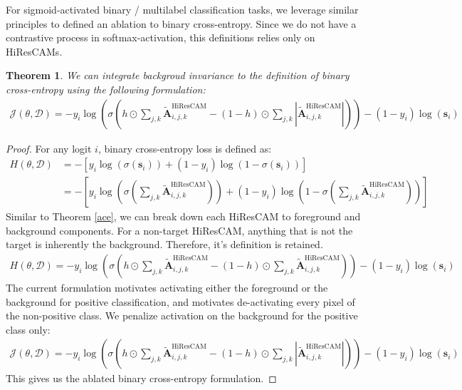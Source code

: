 \documentclass{article}
\theoremstyle{plain}
\newtheorem{theorem}{Theorem}[section]
\theoremstyle{definition}
\theoremstyle{remark}
\begin{document}
For sigmoid-activated binary / multilabel classification tasks, we leverage similar principles to defined an ablation to binary cross-entropy. Since we do not have a contrastive process in softmax-activation, this definitions relies only on HiResCAMs.

\begin{theorem}\label{abce}
	We can integrate backgroud invariance to the definition of binary cross-entropy using the following formulation:
	\begin{gather}
		\mathcal{J}(\theta, \mathcal{D}) = - y_i \log \left(\sigma\left(h \odot \sum_{j,k}\tilde{\mathcal{\bm{A}}}_{i,j,k}^{\text{HiResCAM}} - (1-h) \odot \sum_{j,k}|\tilde{\mathcal{\bm{A}}}_{i,j,k}^{\text{HiResCAM}}|\right) \right) - (1 - y_i) \log \left( \bm{s}_i \right)
	\end{gather}
\end{theorem}
\begin{proof} For any logit $i$, binary cross-entropy loss is defined as:
	\begin{align}
		H(\theta, \mathcal{D}) &= -\left[ y_i \log (\sigma(\bm{s}_i)) + (1 - y_i) \log (1 - \sigma(\bm{s}_i)) \right] \\
		&= -\left[ y_i \log \left(\sigma\left(\sum_{j,k}\tilde{\mathcal{\bm{A}}}_{i,j,k}^{\text{HiResCAM}}\right) \right) + (1 - y_i) \log \left(1 - \sigma\left(\sum_{j,k}\tilde{\mathcal{\bm{A}}}_{i,j,k}^{\text{HiResCAM}}\right) \right) \right]
	\end{align}
	Similar to Theorem \ref{ace}, we can break down each HiResCAM to foreground and background components. For a non-target HiResCAM, anything that is not the target is inherently the background. Therefore, it's definition is retained.
	\begin{gather}
		H(\theta, \mathcal{D}) = - y_i \log \left(\sigma\left(h \odot \sum_{j,k}\tilde{\mathcal{\bm{A}}}_{i,j,k}^{\text{HiResCAM}} - (1-h) \odot \sum_{j,k}\tilde{\mathcal{\bm{A}}}_{i,j,k}^{\text{HiResCAM}}\right) \right) - (1 - y_i) \log \left( \bm{s}_i \right)
	\end{gather}
	The current formulation motivates activating either the foreground or the background for positive classification, and motivates de-activating every pixel of the non-positive class. We penalize activation on the background for the positive class only:
	\begin{gather}
		\mathcal{J}(\theta, \mathcal{D}) = - y_i \log \left(\sigma\left(h \odot \sum_{j,k}\tilde{\mathcal{\bm{A}}}_{i,j,k}^{\text{HiResCAM}} - (1-h) \odot \sum_{j,k}|\tilde{\mathcal{\bm{A}}}_{i,j,k}^{\text{HiResCAM}}|\right) \right) - (1 - y_i) \log \left( \bm{s}_i \right)
	\end{gather}
	This gives us the ablated binary cross-entropy formulation.
\end{proof}
\end{document}
